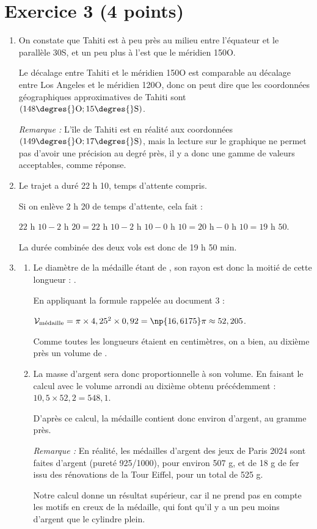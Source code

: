 \documentclass[12pt,a4paper,french]{article}
\begin{document}
\section*{Exercice 3 (4 points)}
\begin{enumerate}
	\item On constate que Tahiti est à peu près au milieu entre l'équateur et le parallèle 30\degres{}S, et un peu plus à l'est que le méridien 150\degres{}O.

	Le décalage entre Tahiti et le méridien 150\degres{}O est comparable au décalage entre Los Angeles et le méridien 120\degres{}O, donc on peut dire que les coordonnées géographiques approximatives de Tahiti sont $(148\degres{}\mathrm{O} ; 15\degres{}\mathrm{S})$.

	\emph{Remarque :} L'île de Tahiti est en réalité aux coordonnées $(149\degres{}\mathrm{O} ; 17\degres{}\mathrm{S})$, mais la lecture sur le graphique ne permet pas d'avoir une précision au degré près, il y a donc une gamme de valeurs acceptables, comme réponse.

	\item Le trajet a duré 22 h 10, temps d'attente compris.

	Si on enlève 2 h 20 de temps d'attente, cela fait :

	$22\text{ h }10 - 2\text{ h }20 = 22\text{ h }10 - 2 \text{ h }10 - 0\text{ h }10 = 20\text{ h} - 0\text{ h }10 = 19\text{ h }50$.

	La durée combinée des deux vols est donc de 19 h 50 min.

	\item \begin{enumerate}
		\item Le diamètre de la médaille étant de , son rayon est donc la moitié de cette longueur : .

		En appliquant la formule rappelée au document 3 :

		$\mathcal{V}_{\text{médaille}} = \pi \times 4,25^2 \times 0,92 = \np{16,6175}\pi \approx52,205$.

		Comme toutes les longueurs étaient en centimètres, on a bien, au dixième près un volume de .

		\item La masse d'argent sera donc proportionnelle à son volume. En faisant le calcul avec le volume arrondi au dixième obtenu précédemment :\quad
		$10,5 \times 52,2 = 548,1$.

		D'après ce calcul, la médaille contient donc environ  d'argent, au gramme près.

		\emph{Remarque :} En réalité, les médailles d'argent des jeux de Paris 2024 sont faites d'argent (pureté 925/1000), pour environ 507 g, et de 18 g de fer issu des rénovations de la Tour Eiffel, pour un total de 525 g.

		Notre calcul donne un résultat supérieur, car il ne prend pas en compte les motifs en creux de la médaille, qui font qu'il y a un peu moins d'argent que le cylindre plein.


	\end{enumerate}
\end{enumerate}
\end{document}
